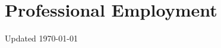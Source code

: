 \documentclass[11pt,letterpaper]{report}
\newcommand{\listitemspace}{0.25em}
\renewenvironment{itemize}
{\begin{list}{}{\setlength{\leftmargin}{0em}
                \setlength{\parskip}{0em}
                \setlength{\itemsep}{\listitemspace}
                \setlength{\parsep}{\listitemspace}}}
{\end{list}}
\begin{document}
%
%
%



%
%
%



%
%
%



    \section*{Professional Employment}

    \begin{tablist}


    \end{tablist}



    \begin{center}
        \vfill
        Updated \monthyeardate\today
    \end{center}
\end{document}

